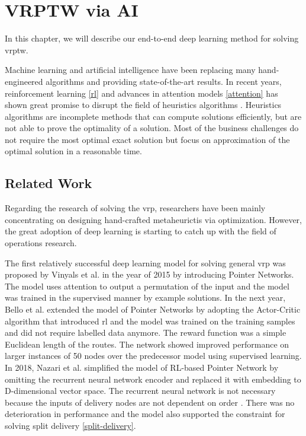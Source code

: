 \chapter{VRPTW via AI}\label{vrptw-ai}
In this chapter, we will describe our end-to-end deep learning method for solving \gls{vrptw}.

Machine learning and artificial intelligence have been replacing many hand-engineered algorithms and providing state-of-the-art results. In recent years, reinforcement learning \ref{rl} and advances in attention models \ref{attention} has shown great promise to disrupt the field of heuristics algorithms \cite{rl-constraint-opt, attention-route, dpdp}. Heuristics algorithms \cite{heuristics-algo} are incomplete methods that can compute solutions efficiently, but are not able to prove the optimality of a solution. Most of the business challenges do not require the most optimal exact solution \cite{excat-algo} but focus on approximation of the optimal solution in a reasonable time.

\section{Related Work}
Regarding the research of solving the \gls{vrp}, researchers have been mainly concentrating on designing hand-crafted metaheurictis via optimization. However, the great adoption of deep learning is starting to catch up with the field of operations research.

The first relatively successful deep learning model for solving general \gls{vrp} was proposed by Vinyals et al. \cite{vinyals} in the year of 2015 by introducing Pointer Networks. The model uses attention to output
a permutation of the input and the model was trained in the supervised manner by example solutions. In the next year, Bello et al. \cite{actor-critic-pointer} extended the model of Pointer Networks by adopting the Actor-Critic algorithm that introduced \gls{rl} and the model was trained on the training samples and did not require labelled data anymore. The reward function was a simple Euclidean length of the routes. The network showed improved performance on larger instances of 50 nodes over the predecessor model using supervised learning. In 2018, Nazari et al. \cite{nazari} simplified the model of RL-based Pointer Network by omitting the recurrent neural network encoder and replaced it with embedding to D-dimensional vector space. The recurrent neural network is not necessary because the inputs of delivery nodes are not dependent on order \cite{nazari}. There was no deterioration in performance and the model also supported the constraint for solving split delivery \ref{split-delivery}.

